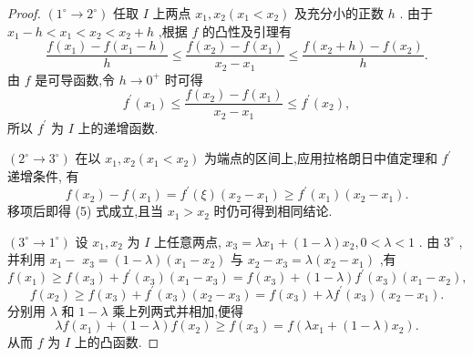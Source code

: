 \begin{proof}
\(\left( {{1}^{ \circ  } \rightarrow  {2}^{ \circ  }}\right)\) 任取 \(I\) 上两点 \({x}_{1},{x}_{2}\left( {{x}_{1} < {x}_{2}}\right)\) 及充分小的正数 \(h\) . 由于 \({x}_{1} - h < {x}_{1} < {x}_{2} < {x}_{2} + h\) ,根据 \(f\) 的凸性及引理有
\[
\frac{f\left( {x}_{1}\right)  - f\left( {{x}_{1} - h}\right) }{h} \leq  \frac{f\left( {x}_{2}\right)  - f\left( {x}_{1}\right) }{{x}_{2} - {x}_{1}} \leq  \frac{f\left( {{x}_{2} + h}\right)  - f\left( {x}_{2}\right) }{h}.
\]
由 \(f\) 是可导函数,令 \(h \rightarrow  {0}^{ + }\) 时可得
\[
{f}^{\prime }\left( {x}_{1}\right)  \leq  \frac{f\left( {x}_{2}\right)  - f\left( {x}_{1}\right) }{{x}_{2} - {x}_{1}} \leq  {f}^{\prime }\left( {x}_{2}\right) ,
\]
所以 \({f}^{\prime }\) 为 \(I\) 上的递增函数.

\(\left( {{2}^{ \circ  } \rightarrow  {3}^{ \circ  }}\right)\) 在以 \({x}_{1},{x}_{2}\left( {{x}_{1} < {x}_{2}}\right)\) 为端点的区间上,应用拉格朗日中值定理和 \({f}^{\prime }\) 递增条件, 有
\[
f\left( {x}_{2}\right)  - f\left( {x}_{1}\right)  = {f}^{\prime }\left( \xi \right) \left( {{x}_{2} - {x}_{1}}\right)  \geq  {f}^{\prime }\left( {x}_{1}\right) \left( {{x}_{2} - {x}_{1}}\right) .
\]
移项后即得 (5) 式成立,且当 \({x}_{1} > {x}_{2}\) 时仍可得到相同结论.

\(\left( {{3}^{ \circ  } \rightarrow  {1}^{ \circ  }}\right)\) 设 \({x}_{1},{x}_{2}\) 为 \(I\) 上任意两点, \({x}_{3} = \lambda {x}_{1} + \left( {1 - \lambda }\right) {x}_{2},0 < \lambda  < 1\) . 由 \({3}^{ \circ  }\) ,并利用 \({x}_{1} -\)  \({x}_{3} = \left( {1 - \lambda }\right) \left( {{x}_{1} - {x}_{2}}\right)\) 与 \({x}_{2} - {x}_{3} = \lambda \left( {{x}_{2} - {x}_{1}}\right)\) ,有
\[
f\left( {x}_{1}\right)  \geq  f\left( {x}_{3}\right)  + {f}^{\prime }\left( {x}_{3}\right) \left( {{x}_{1} - {x}_{3}}\right)  = f\left( {x}_{3}\right)  + \left( {1 - \lambda }\right) {f}^{\prime }\left( {x}_{3}\right) \left( {{x}_{1} - {x}_{2}}\right) ,
\]
\[
f\left( {x}_{2}\right)  \geq  f\left( {x}_{3}\right)  + {f}^{\prime }\left( {x}_{3}\right) \left( {{x}_{2} - {x}_{3}}\right)  = f\left( {x}_{3}\right)  + \lambda {f}^{\prime }\left( {x}_{3}\right) \left( {{x}_{2} - {x}_{1}}\right) .
\]
分别用 \(\lambda\) 和 \(1 - \lambda\) 乘上列两式并相加,便得
\[
{\lambda f}\left( {x}_{1}\right)  + \left( {1 - \lambda }\right) f\left( {x}_{2}\right)  \geq  f\left( {x}_{3}\right)  = f\left( {\lambda {x}_{1} + \left( {1 - \lambda }\right) {x}_{2}}\right) .
\]
从而 \(f\) 为 \(I\) 上的凸函数.
\end{proof}


